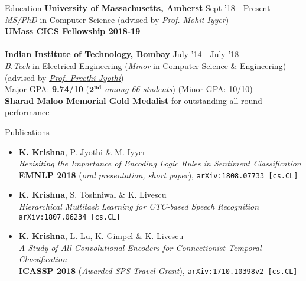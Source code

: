 \documentclass{resume} %
\begin{document}
\vspace*{-1mm}
\begin{rSection}{Education}
{\bf University of Massachusetts, Amherst} \hfill {Sept '18 - Present} \\ \textit{MS/PhD} in Computer Science (advised by \textit{\href{https://people.cs.umass.edu/~miyyer/}{Prof. Mohit Iyyer}}) \\
\textbf{UMass CICS Fellowship 2018-19}\\\\
{\bf Indian Institute of Technology, Bombay} \hfill {July '14 - July '18} \\ 
\textit{B.Tech} in Electrical Engineering (\textit{Minor} in Computer Science \& Engineering)\\
(advised by \textit{\href{https://www.cse.iitb.ac.in/~pjyothi/}{Prof. Preethi Jyothi}})\\
Major GPA: \textbf{9.74/10} (\textit{$\mathbf{2^{nd}}$ among 66 students}) (Minor GPA: 10/10)\\
\textbf{Sharad Maloo Memorial Gold Medalist} for outstanding all-round performance
\end{rSection}
\vspace*{-1.5mm}
\begin{rSection}{Publications}
\begin{itemize}[leftmargin=*]
\item \textbf{K. Krishna}, P. Jyothi \& M. Iyyer\\\textit{Revisiting the Importance of Encoding Logic Rules in Sentiment Classification}\\ \textbf{EMNLP 2018} (\textit{oral presentation, short paper}), 
\texttt{arXiv:1808.07733 [cs.CL]}
\item \textbf{K. Krishna}, S. Toshniwal \& K. Livescu\\\textit{Hierarchical Multitask Learning for CTC-based Speech Recognition}\\ \texttt{arXiv:1807.06234 [cs.CL]} 
\item \textbf{K. Krishna}, L. Lu, K. Gimpel \&  K. Livescu\\\textit{A Study of All-Convolutional Encoders for Connectionist Temporal Classification}\\ \textbf{ICASSP 2018} (\textit{Awarded SPS Travel Grant}), \texttt{arXiv:1710.10398v2 [cs.CL]} 
\end{itemize}
\end{rSection}
\end{document}
